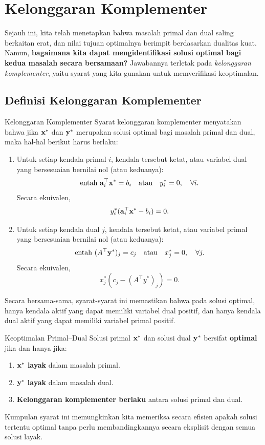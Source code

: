 \section{Kelonggaran Komplementer}
\label{sec:complementary-slackness}

Sejauh ini, kita telah menetapkan bahwa masalah primal dan dual saling berkaitan erat, dan nilai tujuan optimalnya berimpit berdasarkan dualitas kuat. Namun, \textbf{bagaimana kita dapat mengidentifikasi solusi optimal bagi kedua masalah secara bersamaan?} Jawabannya terletak pada \textit{kelonggaran komplementer}, yaitu syarat yang kita gunakan untuk memverifikasi keoptimalan.

\subsection{Definisi Kelonggaran Komplementer}
\begin{definition}{Kelonggaran Komplementer}
Syarat kelonggaran komplementer menyatakan bahwa jika \( \mathbf{x}^* \) dan \( \mathbf{y}^* \) merupakan solusi optimal bagi masalah primal dan dual, maka hal-hal berikut harus berlaku:

\begin{enumerate}
\item Untuk setiap kendala primal \( i \), kendala tersebut ketat, atau variabel dual yang bersesuaian bernilai nol (atau keduanya):
\[
\mbox{entah } \mathbf{a}_i^\top \mathbf{x}^* = b_i \quad \mbox{atau} \quad y_i^* = 0, \quad \forall i.
\]
Secara ekuivalen,
\[
y_i^* (\mathbf{a}_i^\top \mathbf{x}^* - b_i) = 0.
\]

\item Untuk setiap kendala dual \( j \), kendala tersebut ketat, atau variabel primal yang bersesuaian bernilai nol (atau keduanya):
\[
\mbox{entah } (A^\top \mathbf{y}^*)_j = c_j \quad \mbox{atau} \quad x_j^* = 0, \quad \forall j.
\]
Secara ekuivalen,
\[
x_j^* (c_j - (A^\top y^*)_j) = 0.
\]
\end{enumerate}
\end{definition}

Secara bersama-sama, syarat-syarat ini memastikan bahwa pada solusi optimal, hanya kendala aktif yang dapat memiliki variabel dual positif, dan hanya kendala dual aktif yang dapat memiliki variabel primal positif.
\begin{theorem}{Keoptimalan Primal--Dual}\label{thm:cs-optimality}
Solusi primal $\mathbf{x}^*$ dan solusi dual $\mathbf{y}^*$ bersifat \textbf{optimal} jika dan hanya jika:
\begin{enumerate}
\item $\mathbf{x}^*$ \textbf{layak} dalam masalah primal.
\item $\mathbf{y}^*$ \textbf{layak} dalam masalah dual.
\item \textbf{Kelonggaran komplementer berlaku} antara solusi primal dan dual.
\end{enumerate}
\end{theorem}
Kumpulan syarat ini memungkinkan kita memeriksa secara efisien apakah solusi tertentu optimal tanpa perlu membandingkannya secara eksplisit dengan semua solusi layak.

